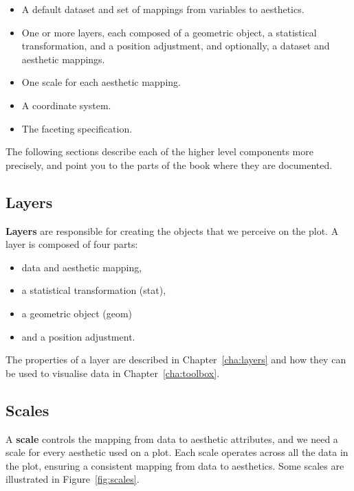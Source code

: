 \begin{itemize}
  \item A default dataset and set of mappings from variables to aesthetics.
  \item One or more layers, each composed of a geometric object, a statistical transformation, and a position adjustment, and optionally, a dataset and aesthetic mappings.
  \item One scale for each aesthetic mapping.
  \item A coordinate system.
  \item The faceting specification.
\end{itemize}

The following sections describe each of the higher level components more precisely, and point you to the parts of the book where they are documented.

\subsection{Layers}

\textbf{Layers} are responsible for creating the objects that we perceive on the plot.  A layer is composed of four parts:  

\begin{itemize}
  \item data and aesthetic mapping,
  \item a statistical transformation (stat), 
  \item a geometric object (geom)
  \item and a position adjustment.
\end{itemize}

\noindent The properties of a layer are described in Chapter~\ref{cha:layers} and how they can be used to visualise data in Chapter~\ref{cha:toolbox}.

\subsection{Scales}\label{sec:scales}

A {\bf scale} controls the mapping from data to aesthetic attributes, and we need a scale for every aesthetic used on a plot.  Each scale operates across all the data in the plot, ensuring a consistent mapping from data to aesthetics.  Some scales are illustrated in Figure~\ref{fig:scales}.

% 


